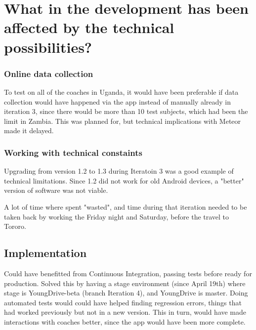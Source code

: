 \section{What in the development has been affected by the technical possibilities?}


\subsubsection{Online data collection}
To test on all of the coaches in Uganda, it would have been preferable if data collection would have happened via the app instead of manually already in iteration 3, since there would be more than 10 test subjects, which had been the limit in Zambia. This was planned for, but technical implications with Meteor made it delayed.


\subsubsection{Working with technical constaints}
Upgrading from version 1.2 to 1.3 during Iteratoin 3 was a good example of technical limitations. Since 1.2 did not work for old Android devices, a "better" version of software was not viable.

A lot of time where spent "wasted", and time during that iteration needed to be taken back by working the Friday night and Saturday, before the travel to Tororo.

\subsection{Implementation}
Could have benefitted from Continuous Integration, passing tests before ready for production. Solved this by having a stage environment (since April 19th) where stage is YoungDrive-beta (branch Iteration 4), and YoungDrive is master. Doing automated tests would could have helped finding regression errors, things that had worked previously but not in a new version. This in turn, would have made interactions with coaches better, since the app would have been more complete. 

